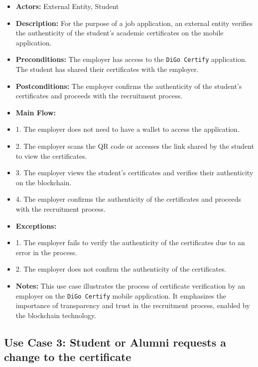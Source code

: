 \begin{itemize}

    \item \textbf{Actors:} External Entity, Student
    \item \textbf{Description:} For the purpose of a job application, an external entity verifies the authenticity of the student's academic certificates on the mobile application.
    \item \textbf{Preconditions:} The employer has access to the \texttt{DiGo Certify} application. The student has shared their certificates with the employer.
    \item \textbf{Postconditions:} The employer confirms the authenticity of the student's certificates and proceeds with the recruitment process.
    \item \textbf{Main Flow:}
    \item 1. The employer does not need to have a wallet to access the application.
    \item 2. The employer scans the QR code or accesses the link shared by the student to view the certificates.
    \item 3. The employer views the student's certificates and verifies their authenticity on the blockchain.
    \item 4. The employer confirms the authenticity of the certificates and proceeds with the recruitment process.
    \item \textbf{Exceptions:}
    \item 1. The employer fails to verify the authenticity of the certificates due to an error in the process.
    \item 2. The employer does not confirm the authenticity of the certificates.
    \item \textbf{Notes:} This use case illustrates the process of certificate verification by an employer on the \texttt{DiGo Certify} mobile application. It emphasizes the importance of transparency and trust in the recruitment process, enabled by the blockchain technology.

\end{itemize}

\subsection{Use Case 3: Student or Alumni requests a change to the certificate}

